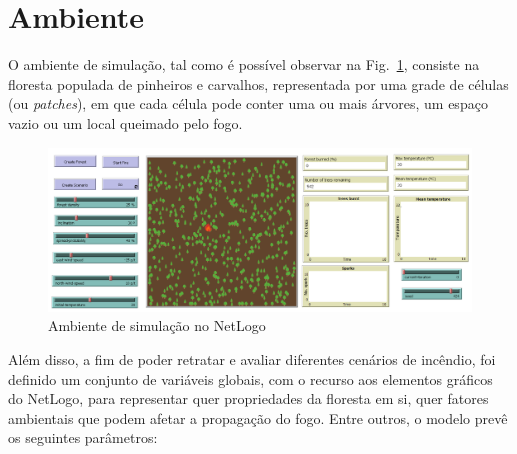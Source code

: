 \section{Ambiente}\label{sec:environment}

O ambiente de simulação, tal como é possível observar na Fig.~\ref{fig:environment}, consiste na floresta populada de pinheiros e carvalhos, representada por uma grade de células (ou \textit{patches}), em que cada célula pode conter uma ou mais árvores, um espaço vazio ou um local queimado pelo fogo.

\begin{figure}[htbp]
    \centering
    \includegraphics[width=\linewidth]{paper/images/environment}
    \caption{Ambiente de simulação no NetLogo}
    \label{fig:environment}
\end{figure}

Além disso, a fim de poder retratar e avaliar diferentes cenários de incêndio, foi definido um conjunto de variáveis globais, com o recurso aos elementos gráficos do NetLogo, para representar quer propriedades da floresta em si, quer fatores ambientais que podem afetar a propagação do fogo. Entre outros, o modelo prevê os seguintes parâmetros:

